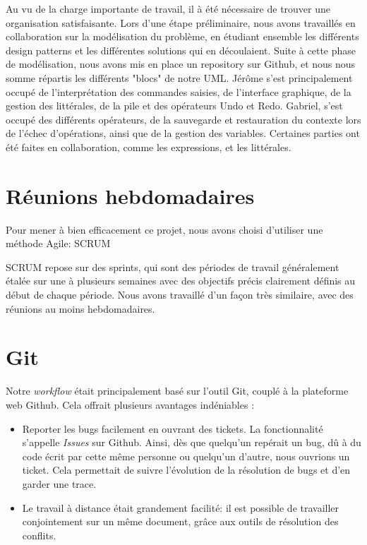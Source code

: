 Au vu de la charge importante de travail, il à été nécessaire de trouver une organisation satisfaisante. Lors d'une étape préliminaire, nous avons travaillés en collaboration sur la modélisation du problème, en étudiant ensemble les différents design patterns et les différentes solutions qui en découlaient. Suite à cette phase de modélisation, nous avons mis en place un repository sur Github, et nous nous somme répartis les différents "blocs" de notre UML. Jérôme s'est principalement occupé de l'interprétation des commandes saisies, de l'interface graphique, de la gestion des littérales, de la pile et des opérateurs Undo et Redo. Gabriel, s'est occupé des différents opérateurs, de la sauvegarde et restauration du contexte lors de l'échec d'opérations, ainsi que de la gestion des variables. Certaines parties ont été faites en collaboration, comme les expressions, et les littérales.



\section{Réunions hebdomadaires}

Pour mener à bien efficacement ce projet, nous avons choisi d'utiliser une méthode Agile: SCRUM

\medskip

SCRUM repose sur des sprints, qui sont des périodes de travail généralement étalée sur une à plusieurs semaines avec des objectifs précis clairement définis au début de chaque période. Nous avons travaillé d'un façon très similaire, avec des réunions au moins hebdomadaires.

\section{Git}

Notre \textit{workflow} était principalement basé sur l'outil Git, couplé à la plateforme web Github. Cela offrait plusieurs avantages indéniables :

\begin{itemize}
      \item Reporter les bugs facilement en ouvrant des tickets. La fonctionnalité s'appelle \textit{Issues} sur Github. Ainsi, dès que quelqu'un repérait un bug, dû à du code écrit par cette même personne ou quelqu'un d'autre, nous ouvrions un ticket. Cela permettait de suivre l'évolution de la résolution de bugs et d'en garder une trace.
      \item Le travail à distance était grandement facilité: il est possible de travailler conjointement sur un même document, grâce aux outils de résolution des conflits.
   
\end{itemize}




